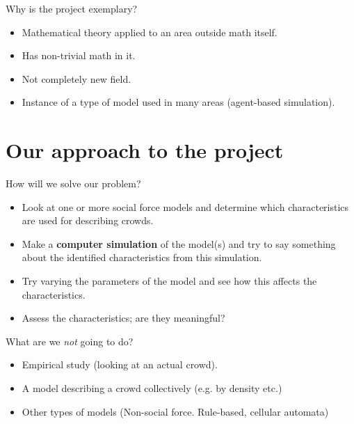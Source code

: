 \documentclass{beamer}
\begin{document}
\begin{frame}{Why is the project exemplary?}
    \begin{itemize}
        \item Mathematical theory applied to an area outside math itself.
        \item Has non-trivial math in it.
        \item Not completely new field.
        \item Instance of a type of model used in many areas (agent-based 
            simulation).
    \end{itemize}
\end{frame}


\section{Our approach to the project}
\begin{frame}{How will we solve our problem?}
    \begin{itemize}
            \item Look at one or more social force models and determine which 
                characteristics are used for describing crowds.
            \item Make a \textbf{computer simulation} of the model(s) and try 
                to say something about the identified characteristics from 
                this simulation.
            \item Try varying the parameters of the model and see how this 
                affects the characteristics.
            \item Assess the characteristics; are they meaningful?
    \end{itemize}
\end{frame}

\begin{frame}{What are we \emph{not} going to do?}
    \begin{itemize}
        \item Empirical study (looking at an actual crowd).
        \item A model describing a crowd collectively (e.g. by density etc.)
        \item Other types of models (Non-social force. Rule-based, cellular 
            automata)
    \end{itemize}
\end{frame}
\end{document}
